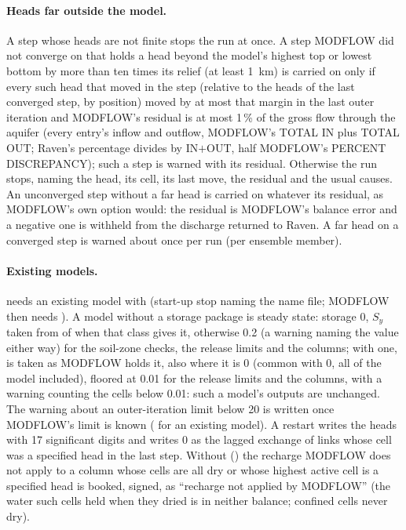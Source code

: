 \paragraph{Heads far outside the model.} A step whose heads are not finite stops the run at once. A step MODFLOW did not
converge on that holds a head beyond the model's highest top or lowest bottom by more than ten times its relief (at least
1~km) is carried on only if every such head that moved in the step (relative to the heads of the last converged step, by
position) moved by at most that margin in the last outer iteration and MODFLOW's residual is at most 1\,\% of the gross flow
through the aquifer (every entry's inflow and outflow, MODFLOW's TOTAL IN plus TOTAL OUT; Raven's percentage divides by
IN$+$OUT, half MODFLOW's PERCENT DISCREPANCY); such a step is warned with its residual. Otherwise the run stops, naming the
head, its cell, its last move, the residual and the usual causes. An unconverged step without a far head is carried on
whatever its residual, as MODFLOW's own  option would: the residual is MODFLOW's balance error and a negative one
is withheld from the discharge returned to Raven. A far head on a converged step is warned about once per run (per ensemble
member).

\paragraph{Existing models.}  needs an existing model with  (start-up stop naming the name
file; MODFLOW then needs ). A model without a storage package is steady state: storage 0,
$S_y$ taken from  of  when that class gives it, otherwise 0.2 (a warning naming
the value either way) for the soil-zone checks, the release limits and the columns; with one,  is taken as
MODFLOW holds it, also where it is 0 (common with  0, all of the model included), floored at 0.01 for the
release limits and the columns, with a warning counting the cells below 0.01: such a model's outputs are unchanged. The warning
about an outer-iteration limit below 20 is written once MODFLOW's limit is known ( for an existing model).
A restart writes the heads with 17 significant digits and writes 0 as the lagged exchange of links whose cell was a specified
head in the last step. Without  () the recharge MODFLOW does not apply to a column whose
cells are all dry or whose highest active cell is a specified head is booked, signed, as ``recharge not applied by MODFLOW''
(the water such cells held when they dried is in neither balance; confined cells never dry).
